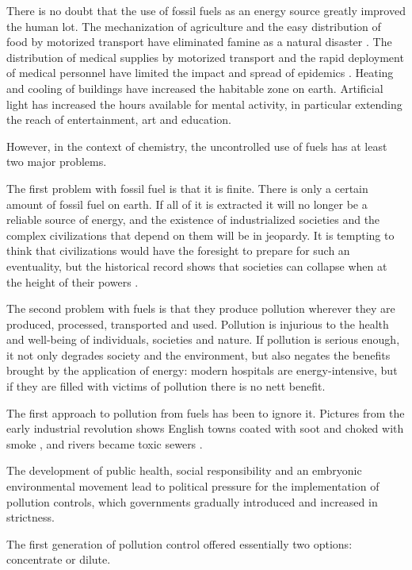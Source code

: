 There is no doubt that the use of fossil fuels as an energy source greatly
improved the human lot. The mechanization of agriculture and the easy
distribution of food by motorized transport have eliminated famine as a natural
disaster \autocite{Angelis2007}. The distribution of medical supplies by
motorized transport and the rapid deployment of medical personnel have limited
the impact and spread of epidemics \autocite{Ministere2018}. Heating and cooling
of buildings have increased the habitable zone on earth. Artificial light has
increased the hours available for mental activity, in particular extending the
reach of entertainment, art and education.

However, in the context of chemistry, the uncontrolled use of fuels has at
least two major problems.

The first problem with fossil fuel is that it is finite. There is only a certain
amount of fossil fuel on earth. If all of it is extracted it will no longer be a
reliable source of energy, and the existence of industrialized societies and the
complex civilizations that depend on them will be in jeopardy. It is tempting to
think that civilizations would have the foresight to prepare for such an
eventuality, but the historical record shows that societies can collapse when at
the height of their powers \autocite{Diamond2006}.

The second problem with fuels is that they produce pollution wherever they are
produced, processed, transported and used. Pollution is injurious to the health
and well-being of individuals, societies and nature. If pollution is serious
enough, it not only degrades society and the environment, but also negates the
benefits brought by the application of energy: modern hospitals are
energy-intensive, but if they are filled with victims of pollution there is no
nett benefit.

The first approach to pollution from fuels has been to ignore it. Pictures
from the early industrial revolution shows English towns coated with soot and
choked with smoke \autocite{Flick1980}, and rivers became toxic
sewers \autocite{Halliday2001}.

The development of public health, social responsibility \autocite{Szreter2003}
and an embryonic environmental movement \autocite{Williams1965} lead to
political pressure for the implementation of pollution controls, which governments
gradually introduced and increased in strictness.

The first generation of pollution control offered essentially two options:
concentrate or dilute.

